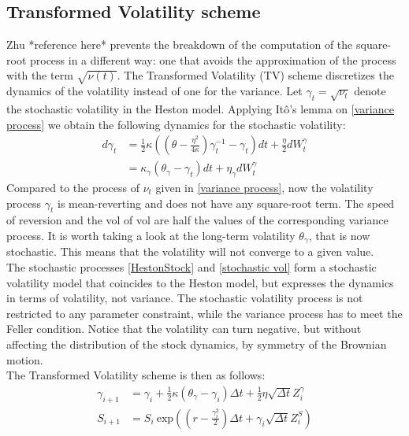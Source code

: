 \documentclass[12pt]{article}
\numberwithin{equation}{section}
\begin{document}
\subsection{Transformed Volatility scheme}
Zhu *reference here* prevents the breakdown of the computation of the square-root process in a different way: one that avoids the approximation of the process with the term $\sqrt{\nu(t)}$. The Transformed Volatility (TV) scheme discretizes the dynamics of the volatility instead of one for the variance. Let $\gamma_t = \sqrt{\nu_t}$ denote the stochastic volatility in the Heston model. Applying It\^o's lemma on \ref{variance process} we obtain the following dynamics for the stochastic volatility:
\begin{equation}\label{stochastic vol}
	\begin{aligned}
		d\gamma_t &= \frac{1}{2}\kappa \left( \left( \theta - \frac{\eta^2}{4\kappa} \right) \gamma_t^{-1} - \gamma_t \right) dt + \frac{\eta}{2}dW_t^\gamma \\
		&= \kappa_\gamma (\theta_\gamma - \gamma_t) dt + \eta_\gamma dW_t^\gamma
	\end{aligned}
\end{equation}
Compared to the process of $\nu_t$ given in \ref{variance process}, now the volatility process $\gamma_t$ is mean-reverting and does not have any square-root term. The speed of reversion and the vol of vol are half the values of the corresponding variance process. It is worth taking a look at the long-term volatility $\theta_\gamma$, that is now stochastic. This means that the volatility will not converge to a given value. \\
\newline
The stochastic processes \ref{HestonStock} and \ref{stochastic vol} form a stochastic volatility model that coincides to the Heston model, but expresses the dynamics in terms of volatility, not variance. The stochastic volatility process is not restricted to any parameter constraint, while the variance process has to meet the Feller condition. Notice that the volatility can turn negative, but without affecting the distribution of the stock dynamics, by symmetry of the Brownian motion. \\
\newline
The Transformed Volatility scheme is then as follows:
\begin{align}\label{TV}
		\gamma_{i+1} &= \gamma_{i} + \frac{1}{2}\kappa(\theta_\gamma - \gamma_{i})\Delta t + \frac{1}{2}\eta\sqrt{\Delta t}Z_i^\gamma \\
		\label{TV2}		
		S_{i+1} &= S_i \ \text{exp} \left ( \left (r - \frac{\gamma_i^2}{2} \right  ) \Delta t + \gamma_i \sqrt{\Delta t} Z_i^S \right )
\end{align}
\end{document}

